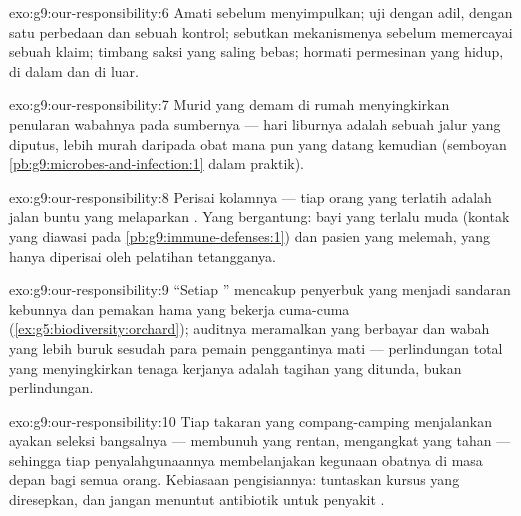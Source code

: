 \begin{solution}{exo:g9:our-responsibility:6}
Amati sebelum menyimpulkan; uji dengan adil, dengan satu
perbedaan dan sebuah kontrol; sebutkan mekanismenya sebelum
memercayai sebuah klaim; timbang saksi yang saling bebas;
hormati permesinan yang hidup, di dalam dan di luar.
\end{solution}

\begin{solution}{exo:g9:our-responsibility:7}
Murid yang demam di rumah menyingkirkan penularan wabahnya
pada sumbernya --- hari liburnya adalah sebuah jalur yang
diputus, lebih murah daripada obat mana pun yang datang
kemudian (semboyan \cref{pb:g9:microbes-and-infection:1}
dalam praktik).
\end{solution}

\begin{solution}{exo:g9:our-responsibility:8}
Perisai kolamnya --- tiap orang yang terlatih adalah jalan
buntu yang melaparkan . Yang bergantung: bayi
yang terlalu muda (kontak yang diawasi pada
\cref{pb:g9:immune-defenses:1}) dan pasien yang 
melemah, yang hanya diperisai oleh pelatihan tetangganya.
\end{solution}

\begin{solution}{exo:g9:our-responsibility:9}
``Setiap '' mencakup penyerbuk yang menjadi sandaran
 kebunnya dan pemakan hama yang bekerja cuma-cuma
(\cref{ex:g5:biodiversity:orchard}); auditnya meramalkan
 yang berbayar dan wabah yang lebih buruk sesudah
para pemain penggantinya mati --- perlindungan total yang
menyingkirkan tenaga kerjanya adalah tagihan yang ditunda,
bukan perlindungan.
\end{solution}

\begin{solution}{exo:g9:our-responsibility:10}
Tiap takaran yang compang-camping menjalankan ayakan seleksi
bangsalnya --- membunuh yang rentan, mengangkat yang tahan
--- sehingga tiap penyalahgunaannya membelanjakan kegunaan
obatnya di masa depan bagi semua orang. Kebiasaan
pengisiannya: tuntaskan kursus yang diresepkan, dan jangan
menuntut antibiotik untuk penyakit .
\end{solution}

